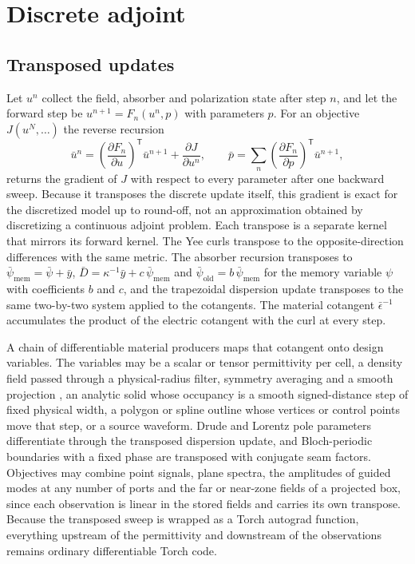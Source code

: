\documentclass[11pt,a4paper]{article}
\begin{document}
\section{Discrete adjoint}
\label{sec:adjoint}

\subsection{Transposed updates}

Let $u^{n}$ collect the field, absorber and polarization state after step $n$, and let the forward step be $u^{n+1}=F_n(u^{n},p)$ with parameters $p$. For an objective $J(u^{N},\ldots)$ the reverse recursion
\begin{equation}
\bar u^{n}=\left(\frac{\partial F_n}{\partial u}\right)^{\!\mathsf T}\bar u^{n+1}+\frac{\partial J}{\partial u^{n}},\qquad
\bar p=\sum_n\left(\frac{\partial F_n}{\partial p}\right)^{\!\mathsf T}\bar u^{n+1},
\label{eq:adjoint}
\end{equation}
returns the gradient of $J$ with respect to every parameter after one backward sweep. Because it transposes the discrete update itself, this gradient is exact for the discretized model up to round-off, not an approximation obtained by discretizing a continuous adjoint problem. Each transpose is a separate kernel that mirrors its forward kernel. The Yee curls transpose to the opposite-direction differences with the same metric. The absorber recursion transposes to $\bar\psi_{\mathrm{mem}}=\bar\psi+\bar y$, $\bar D=\kappa^{-1}\bar y+c\,\bar\psi_{\mathrm{mem}}$ and $\bar\psi_{\mathrm{old}}=b\,\bar\psi_{\mathrm{mem}}$ for the memory variable $\psi$ with coefficients $b$ and $c$, and the trapezoidal dispersion update transposes to the same two-by-two system applied to the cotangents. The material cotangent $\bar\epsilon^{-1}$ accumulates the product of the electric cotangent with the curl at every step.

A chain of differentiable material producers maps that cotangent onto design variables. The variables may be a scalar or tensor permittivity per cell, a density field passed through a physical-radius filter, symmetry averaging and a smooth projection \citep{lazarov2011,wang2011}, an analytic solid whose occupancy is a smooth signed-distance step of fixed physical width, a polygon or spline outline whose vertices or control points move that step, or a source waveform. Drude and Lorentz pole parameters differentiate through the transposed dispersion update, and Bloch-periodic boundaries with a fixed phase are transposed with conjugate seam factors. Objectives may combine point signals, plane spectra, the amplitudes of guided modes at any number of ports and the far or near-zone fields of a projected box, since each observation is linear in the stored fields and carries its own transpose. Because the transposed sweep is wrapped as a Torch autograd function, everything upstream of the permittivity and downstream of the observations remains ordinary differentiable Torch code.
\end{document}
